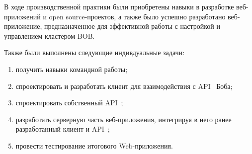 \clearpage


В ходе производственной практики были приобретены навыки в разработке веб-приложений и open source-проектов, а также было успешно разработано веб-приложение, предназначенное для эффективной работы с настройкой и управлением кластером BOB. 

Также были выполнены следующие индивдуальные задачи:
\begin{enumerate}
	\item получить навыки командной работы;
	\item спроектировать и разработать клиент для взаимодействия с API~\cite{api} Боба;
	\item спроектировать собственный API~\cite{api};
	\item разработать серверную часть веб-приложения, интегрируя в него ранее разработанный клиент и API~\cite{api};
	\item провести тестирование итогового Web-приложения.
\end{enumerate}

\clearpage


\begingroup
\renewcommand{\section}[2]{}

   
\endgroup



